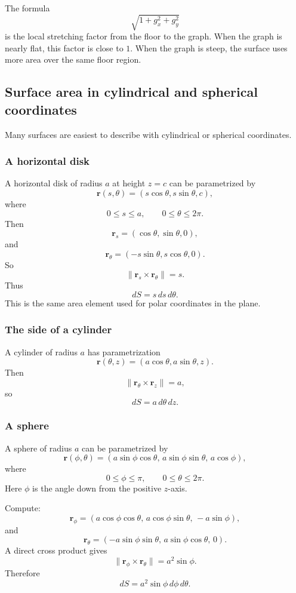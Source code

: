 The formula
\[
    \sqrt{1+g_x^2+g_y^2}
\]
is the local stretching factor from the floor to the graph.  When the graph is nearly
flat, this factor is close to \(1\).  When the graph is steep, the surface uses more area
over the same floor region.

\subsection{Surface area in cylindrical and spherical coordinates}

Many surfaces are easiest to describe with cylindrical or spherical coordinates.

\subsubsection*{A horizontal disk}

A horizontal disk of radius \(a\) at height \(z=c\) can be parametrized by
\[
    \mathbf r(s,\theta)=(s\cos\theta,s\sin\theta,c),
\]
where
\[
    0\le s\le a,
    \qquad
    0\le\theta\le2\pi.
\]
Then
\[
    \mathbf r_s=(\cos\theta,\sin\theta,0),
\]
and
\[
    \mathbf r_\theta=(-s\sin\theta,s\cos\theta,0).
\]
So
\[
    \|\mathbf r_s\times\mathbf r_\theta\|=s.
\]
Thus
\[
\boxed{
    dS=s\,ds\,d\theta.
}
\]
This is the same area element used for polar coordinates in the plane.

\subsubsection*{The side of a cylinder}

A cylinder of radius \(a\) has parametrization
\[
    \mathbf r(\theta,z)=(a\cos\theta,a\sin\theta,z).
\]
Then
\[
    \|\mathbf r_\theta\times\mathbf r_z\|=a,
\]
so
\[
\boxed{
    dS=a\,d\theta\,dz.
}
\]

\subsubsection*{A sphere}

A sphere of radius \(a\) can be parametrized by
\[
    \mathbf r(\phi,\theta)
    =
    (a\sin\phi\cos\theta,\,
     a\sin\phi\sin\theta,\,
     a\cos\phi),
\]
where
\[
    0\le \phi\le\pi,
    \qquad
    0\le \theta\le2\pi.
\]
Here \(\phi\) is the angle down from the positive \(z\)-axis.

Compute:
\[
    \mathbf r_\phi
    =
    (a\cos\phi\cos\theta,\,
     a\cos\phi\sin\theta,\,
     -a\sin\phi),
\]
and
\[
    \mathbf r_\theta
    =
    (-a\sin\phi\sin\theta,\,
     a\sin\phi\cos\theta,\,
     0).
\]
A direct cross product gives
\[
    \|\mathbf r_\phi\times\mathbf r_\theta\|
    =
    a^2\sin\phi.
\]
Therefore
\[
\boxed{
    dS=a^2\sin\phi\,d\phi\,d\theta.
}
\]

